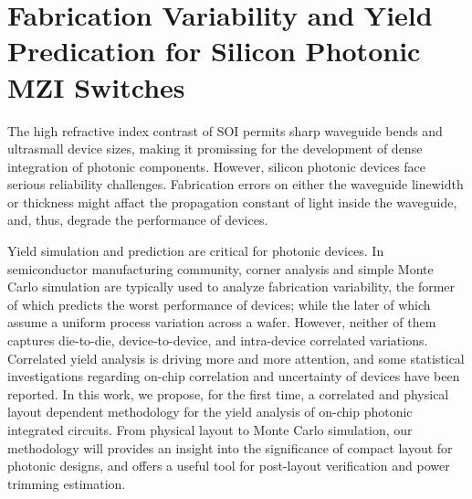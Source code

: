\graphicspath{{figs_chris/}}


\section{Fabrication Variability and Yield Predication for Silicon Photonic MZI Switches}
\label{sec:variability}
The high refractive index contrast of SOI permits sharp waveguide bends and ultrasmall device sizes, making it promissing for the development of dense integration of photonic components. However, silicon photonic devices face serious reliability challenges. Fabrication errors on either the waveguide linewidth or thickness might affact the propagation constant of light inside the waveguide, and, thus, degrade the performance of devices. 

Yield simulation and prediction are critical for photonic devices. In semiconductor manufacturing community, corner analysis and simple Monte Carlo simulation are typically used to analyze fabrication variability, the former of which predicts the worst performance of devices; while the later of which assume a uniform process variation across a wafer. However, neither of them captures die-to-die, device-to-device, and intra-device correlated variations. Correlated yield analysis is driving more and more attention, and some statistical investigations regarding on-chip correlation \cite{lukas14:OFC, hochberg14:wafer} and uncertainty of devices have been reported. In this work, we propose, for the first time, a correlated and physical layout dependent methodology for the yield analysis of on-chip photonic integrated circuits. From physical layout to Monte Carlo simulation, our methodology will provides an insight into the significance of compact layout for photonic designs, and offers a useful tool for post-layout verification and power trimming estimation.

